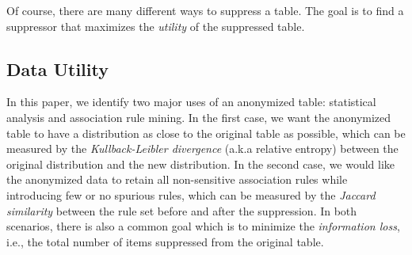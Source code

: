 Of course, there are many different ways to suppress a table. The goal
is to find a suppressor that maximizes the {\em utility} of the suppressed
table.
%
%

\subsection{Data Utility}
\label{sec:du}
In this paper, we identify two major uses of an anonymized table: 
statistical analysis and association rule mining. 
In the first case, we want the anonymized table to have a distribution 
as close to the original table as possible, which can be measured by 
the {\em Kullback-Leibler divergence} 
(a.k.a relative entropy) \cite{kl-divergence} 
between the original distribution and the new 
distribution.  
In the second case, 
we would like the anonymized data to
retain all non-sensitive association rules while introducing few 
or no spurious rules,
which can be measured by the {\em Jaccard similarity} \cite{jaccard-sim}
between the rule set before and after the suppression.
In both scenarios, there is also a common goal which is
to minimize the {\em information loss}, i.e.,
the total number of items suppressed from the original table.

